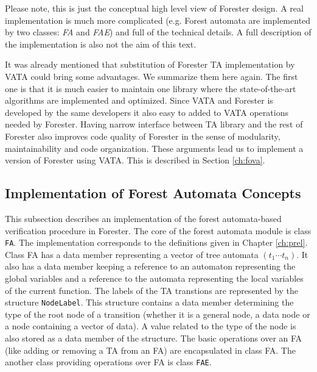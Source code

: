 Please note, this is just the conceptual high level view of Forester design.
A real implementation is much more complicated (e.g. Forest automata are implemented by two classes: \emph{FA} and \emph{FAE})
and full of the technical details.
A full description of the implementation is also not the aim of this text.

It was already mentioned that substitution of Forester TA implementation by
VATA could bring some advantages.
We summarize them here again.
The first one is that it is much easier to maintain one library where
the state-of-the-art algorithms are implemented and optimized.
Since VATA and Forester is developed by the same developers it also easy to added
to VATA operations needed by Forester.
Having narrow interface between TA library and the rest of Forester
also improves code quality of Forester in the sense of modularity, maintainability and code organization.
These arguments lead us to implement a version of Forester using VATA.
This is described in Section \ref{ch:fova}.


\subsection{Implementation of Forest Automata Concepts}
\label{subsec:faimpl}

This subsection describes an implementation of the forest automata-based verification procedure in Forester.
The core of the forest automata module is class {\tt FA}.
The implementation corresponds to the definitions given in Chapter \ref{ch:prel}.
Class FA has a data member representing a vector of tree automata $(t_1 \cdots t_n)$.
It also has a data member keeping a reference to an automaton representing the global variables
and a reference to the automata representing the local variables of the current function. %
The labels of the TA transtions are represented by the structure {\tt NodeLabel}.
This structure contains a data member determining the type of the root node of a transition
(whether it is a general node, a data node or a node containing a vector of data).
A value related to the type of the node is also stored as a data member of the structure.
The basic operations over an FA (like adding or removing a TA from an FA) are encapsulated in class FA.
The another class providing operations over FA is class {\tt FAE}. 

